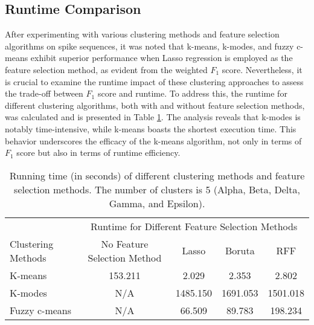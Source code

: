 \documentclass[%
 aip,
 jmp,%
 amsmath,amssymb,
 reprint,%
]{revtex4-2}
\begin{document}
\subsection{Runtime Comparison}
After experimenting with various clustering methods and feature selection algorithms on spike sequences,
it was noted that k-means, k-modes, and fuzzy c-means exhibit superior performance when Lasso regression
is employed as the feature selection method, as evident from the weighted $F_1$ score. Nevertheless, it is
crucial to examine the runtime impact of these clustering approaches to assess the trade-off between $F_1$
score and runtime. To address this, the runtime for different clustering algorithms, both with and without
feature selection methods, was calculated and is presented in Table \ref{tab:tab3}. The analysis reveals
that k-modes is notably time-intensive, while k-means boasts the shortest execution time. This behavior
underscores the efficacy of the k-means algorithm, not only in terms of $F_1$ score but also in terms of
runtime efficiency.
\begin{table}
    \centering
    \caption{Running time (in seconds) of different clustering methods and feature selection methods.
    The number of clusters is 5 (Alpha, Beta, Delta, Gamma, and Epsilon).}
    \begin{tabular}{lcccc}
        \toprule
        & \multicolumn{4}{c}{Runtime for Different Feature Selection Methods}\\
        \cmidrule{2-5}
        Clustering Methods & No Feature Selection Method & Lasso & Boruta & RFF\\
        \midrule
        K-means & 153.211 & 2.029 & 2.353 & 2.802\\
        \midrule
        K-modes & N/A & 1485.150 & 1691.053 & 1501.018\\
        \midrule
        Fuzzy c-means & N/A & 66.509 & 89.783 & 198.234\\
        \bottomrule
    \end{tabular}
    \label{tab:tab3}
\end{table}
\end{document}
